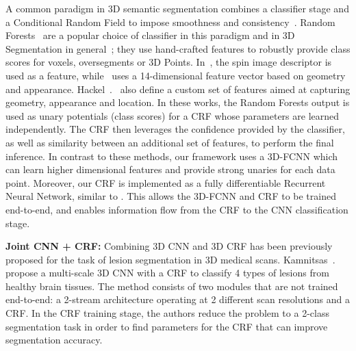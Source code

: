 \documentclass[10pt,twocolumn,letterpaper]{article}
\newcommand{\fccrf}[0]{CRF\xspace}
\newcommand{\threedfcnn}[0]{3D-FCNN\xspace}
\begin{document}
A common paradigm in 3D semantic segmentation combines a classifier stage and a Conditional Random Field to impose smoothness and consistency~\cite{Wolf2015,Wolf2016, Martinovic2015,conf/itsc/WangLA15,Wolf2016}. Random Forests~\cite{Breiman2001,Criminisi2013} are a popular choice of classifier in this paradigm and in 3D Segmentation in general~\cite{Zhang2015,Dohan2015,Chehata09airbornelidar,Brostow2008,Nan2012,Weinmann2014}; they use hand-crafted features to robustly provide class scores for voxels, oversegments or 3D Points. In~\cite{Martinovic2015}, the spin image descriptor is used as a feature, while~\cite{Wolf2015} uses a 14-dimensional feature vector based on geometry and appearance. Hackel~\etal.~\cite{Hackel2016} also define a custom set of features aimed at capturing geometry, appearance and location. In these works, the Random Forests output is used as unary potentials (class scores) for a CRF whose parameters are learned independently. The CRF then leverages the confidence provided by the classifier, as well as similarity between an additional set of features, to perform the final inference. In contrast to these methods, our framework uses a \threedfcnn which can learn higher dimensional features and provide strong unaries for each data point. Moreover, our \fccrf is implemented as a fully differentiable Recurrent Neural Network, similar to \cite{Zheng2015}. This allows the \threedfcnn and \fccrf to be trained end-to-end, and enables information flow from the CRF to the CNN classification stage.

\textbf{Joint CNN + CRF:} Combining 3D CNN and 3D CRF has been previously proposed for the task of lesion segmentation in 3D medical scans. Kamnitsas~\etal.~\cite{Kamnitsas2017} propose a multi-scale 3D CNN with a \fccrf to classify 4 types of lesions from healthy brain tissues. The method consists of two modules that are not trained end-to-end: a 2-stream architecture operating at 2 different scan resolutions and a \fccrf. In the \fccrf training stage, the authors reduce the problem to a 2-class segmentation task in order to find parameters for the CRF that can improve segmentation accuracy. 
\end{document}
